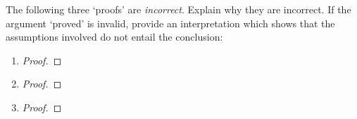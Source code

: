 \practiceproblems
\problempart
The following three `proofs' are \emph{incorrect}. Explain why they are incorrect. If the argument `proved' is invalid, provide an interpretation which shows that the assumptions involved do not entail the conclusion:
\begin{enumerate}
	\item 
	\begin{proof}
	\end{proof}
\item	\begin{proof}
		\open
		\close
	\end{proof}
\item \begin{proof}
	\open{}
	\open
	\open
	\close
	\close
	\close
\end{proof}
\end{enumerate}

